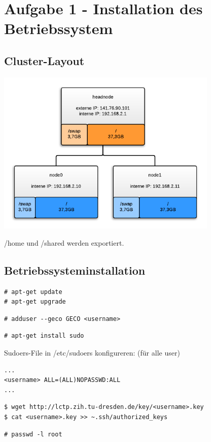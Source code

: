 \chapter{Aufgabe 1 - Installation des Betriebssystem}
\section{Cluster-Layout}
\includegraphics[width=400px]{cluster_layout.png}

/home und /shared werden exportiert.

\section{Betriebssysteminstallation}
\begin{lstlisting}[style=Bash]
# apt-get update 
# apt-get upgrade 
\end{lstlisting}
\begin{lstlisting}[style=Bash]
# adduser --geco GECO <username>
\end{lstlisting}
\begin{lstlisting}[style=Bash]
# apt-get install sudo
\end{lstlisting}
Sudoers-File in /etc/sudoers konfigureren:
(für alle user)
\begin{lstlisting}[style=Bash]
...
<username> ALL=(ALL)NOPASSWD:ALL
...
\end{lstlisting}
\begin{lstlisting}[style=Bash]
$ wget http://lctp.zih.tu-dresden.de/key/<username>.key
$ cat <username>.key >> ~.ssh/authorized_keys
\end{lstlisting}
\begin{lstlisting}[style=Bash]
# passwd -l root 
\end{lstlisting}


